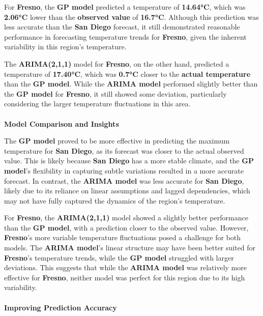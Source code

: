 \documentclass[
  11pt,
]{article}
\makeatletter
\let\oldparagraph\paragraph
\renewcommand{\paragraph}{
    \@ifstar
      \xxxParagraphStar
      \xxxParagraphNoStar
  }
\newcommand{\xxxParagraphStar}[1]{\oldparagraph*{#1}\mbox{}}
\newcommand{\xxxParagraphNoStar}[1]{\oldparagraph{#1}\mbox{}}
\makeatother
\begin{document}
For \textbf{Fresno}, the \textbf{GP model} predicted a temperature of
\textbf{14.64°C}, which was \textbf{2.06°C} lower than the
\textbf{observed value} of \textbf{16.7°C}. Although this prediction was
less accurate than the \textbf{San Diego} forecast, it still
demonstrated reasonable performance in forecasting temperature trends
for \textbf{Fresno}, given the inherent variability in this region's
temperature.

The \textbf{ARIMA(2,1,1)} model for \textbf{Fresno}, on the other hand,
predicted a temperature of \textbf{17.40°C}, which was \textbf{0.7°C}
closer to the \textbf{actual temperature} than the \textbf{GP model}.
While the \textbf{ARIMA model} performed slightly better than the
\textbf{GP model} for \textbf{Fresno}, it still showed some deviation,
particularly considering the larger temperature fluctuations in this
area.

\paragraph{\texorpdfstring{\textbf{Model Comparison and
Insights}}{Model Comparison and Insights}}\label{model-comparison-and-insights}

The \textbf{GP model} proved to be more effective in predicting the
maximum temperature for \textbf{San Diego}, as its forecast was closer
to the actual observed value. This is likely because \textbf{San Diego}
has a more stable climate, and the \textbf{GP model}'s flexibility in
capturing subtle variations resulted in a more accurate forecast. In
contrast, the \textbf{ARIMA model} was less accurate for \textbf{San
Diego}, likely due to its reliance on linear assumptions and lagged
dependencies, which may not have fully captured the dynamics of the
region's temperature.

For \textbf{Fresno}, the \textbf{ARIMA(2,1,1)} model showed a slightly
better performance than the \textbf{GP model}, with a prediction closer
to the observed value. However, \textbf{Fresno}'s more variable
temperature fluctuations posed a challenge for both models. The
\textbf{ARIMA model}'s linear structure may have been better suited for
\textbf{Fresno}'s temperature trends, while the \textbf{GP model}
struggled with larger deviations. This suggests that while the
\textbf{ARIMA model} was relatively more effective for \textbf{Fresno},
neither model was perfect for this region due to its high variability.

\paragraph{\texorpdfstring{\textbf{Improving Prediction
Accuracy}}{Improving Prediction Accuracy}}\label{improving-prediction-accuracy}
\end{document}
